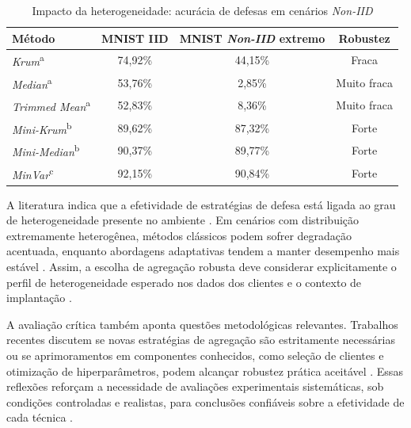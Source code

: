 \begin{table}[H]
    \centering
    \caption{Impacto da heterogeneidade: acurácia de defesas em cenários \textit{Non-IID}}
    \label{tab:analise-heterogeneidade}
    \begin{tabular}{lccc}
        \hline
        \textbf{Método} & \textbf{MNIST IID} & \textbf{MNIST \textit{Non-IID} extremo} & \textbf{Robustez} \\
        \hline
        \textit{Krum}\textsuperscript{a} & 74,92\% & 44,15\% & Fraca \\
        \textit{Median}\textsuperscript{a} & 53,76\% & 2,85\% & Muito fraca \\
        \textit{Trimmed Mean}\textsuperscript{a} & 52,83\% & 8,36\% & Muito fraca \\
        \textit{Mini-Krum}\textsuperscript{b} & 89,62\% & 87,32\% & Forte \\
        \textit{Mini-Median}\textsuperscript{b} & 90,37\% & 89,77\% & Forte \\
        \textit{MinVar}\textsuperscript{c} & 92,15\% & 90,84\% & Forte \\
        \hline
    \end{tabular}
\end{table}

A literatura indica que a efetividade de estratégias de defesa está ligada ao grau de heterogeneidade presente no ambiente \cite{Li2023,Xu2024}. Em cenários com distribuição extremamente heterogênea, métodos clássicos podem sofrer degradação acentuada, enquanto abordagens adaptativas tendem a manter desempenho mais estável \cite{Li2023}. Assim, a escolha de agregação robusta deve considerar explicitamente o perfil de heterogeneidade esperado nos dados dos clientes e o contexto de implantação \cite{Khan2023}.

A avaliação crítica também aponta questões metodológicas relevantes. Trabalhos recentes discutem se novas estratégias de agregação são estritamente necessárias ou se aprimoramentos em componentes conhecidos, como seleção de clientes e otimização de hiperparâmetros, podem alcançar robustez prática aceitável \cite{Fang2025}. Essas reflexões reforçam a necessidade de avaliações experimentais sistemáticas, sob condições controladas e realistas, para conclusões confiáveis sobre a efetividade de cada técnica \cite{Khan2023}.
